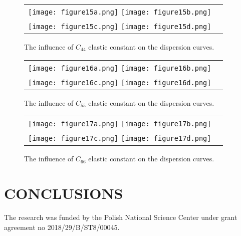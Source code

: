 \documentclass[]{spie}  %
\newcommand{\myfigscale}{0.9}
\begin{document}
\begin{figure} [ht]
	\begin{center}
		\begin{tabular}{cc} %
			\texttt{[image: figure15a.png]}
			\texttt{[image: figure15b.png]}\\
			\texttt{[image: figure15c.png]}
			\texttt{[image: figure15d.png]}
		\end{tabular}
	\end{center}
	\caption[] 
	{ \label{fig:C44} 
		The influence of \(C_{44}\) elastic constant on the dispersion curves.}
\end{figure} 

\begin{figure} [ht]
	\begin{center}
		\begin{tabular}{cc} %
			\texttt{[image: figure16a.png]}
			\texttt{[image: figure16b.png]}\\
			\texttt{[image: figure16c.png]}
			\texttt{[image: figure16d.png]}
		\end{tabular}
	\end{center}
	\caption[] 
	{ \label{fig:C55} 
		The influence of \(C_{55}\) elastic constant on the dispersion curves.}
\end{figure} 

\begin{figure} [ht]
	\begin{center}
		\begin{tabular}{cc} %
			\texttt{[image: figure17a.png]}
			\texttt{[image: figure17b.png]}\\
			\texttt{[image: figure17c.png]}
			\texttt{[image: figure17d.png]}
		\end{tabular}
	\end{center}
	\caption[] 
	{ \label{fig:C66} 
		The influence of \(C_{66}\) elastic constant on the dispersion curves.}
\end{figure} 
\clearpage
\section{CONCLUSIONS}

  
\appendix    %


\acknowledgments %
 
The research was funded by the Polish National Science Center under grant agreement 
no 2018/29/B/ST8/00045. 

\end{document}
